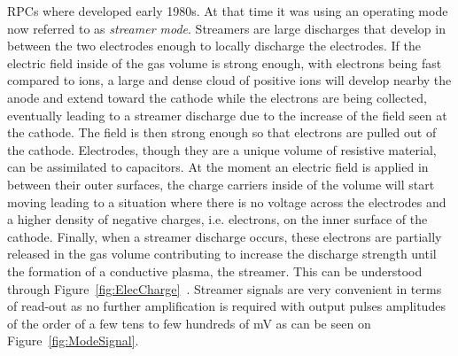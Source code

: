 	RPCs where developed early 1980s. At that time it was using an operating mode now referred to as \textit{streamer mode}. Streamers are large discharges that develop in between the two electrodes enough to locally discharge the electrodes. If the electric field inside of the gas volume is strong enough, with electrons being fast compared to ions, a large and dense cloud of positive ions will develop nearby the anode and extend toward the cathode while the electrons are being collected, eventually leading to a streamer discharge due to the increase of the field seen at the cathode. The field is then strong enough so that electrons are pulled out of the cathode. Electrodes, though they are a unique volume of resistive material, can be assimilated to capacitors. At the moment an electric field is applied in between their outer surfaces, the charge carriers inside of the volume will start moving leading to a situation where there is no voltage across the electrodes and a higher density of negative charges, i.e. electrons, on the inner surface of the cathode. Finally, when a streamer discharge occurs, these electrons are partially released in the gas volume contributing to increase the discharge strength until the formation of a conductive plasma, the streamer. This can be understood through Figure~\ref{fig:ElecCharge}~\cite{CROTTY93}. Streamer signals are very convenient in terms of read-out as no further amplification is required with output pulses amplitudes of the order of a few tens to few hundreds of \si{mV} as can be seen on Figure~\ref{fig:ModeSignal}.
	
